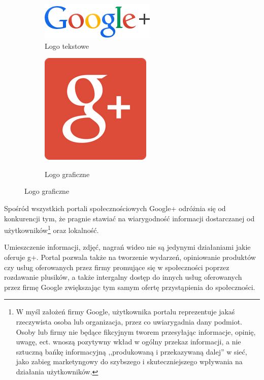 \begin{figure}[!h]
\centering
\begin{subfigure}{.5\textwidth}
  \centering
  \includegraphics[width=.4\linewidth]{images/googleplus_color.png}
  \caption{Logo tekstowe}
  \label{fig:sub1}
\end{subfigure}%
\begin{subfigure}{.5\textwidth}
  \centering
  \scalebox{0.7}
  {
      \includegraphics[width=.4\linewidth]{images/google-plus-logo.png}
  }  
  \caption{Logo graficzne}
  \label{fig:sub2}
\end{subfigure}
\label{fig:logo-google}
\end{figure}

Spośród wszystkich portali społecznościowych Google+ odróżnia się od konkurencji tym, że pragnie stawiać na wiarygodność informacji dostarczanej od użytkowników\footnote{W myśl założeń firmy Google, użytkownika portalu reprezentuje jakaś rzeczywista osoba lub organizacja, przez co uwiarygadnia dany podmiot. Osoby lub firmy nie będące fikcyjnym tworem przesyłając informacje, opinię, uwagę, ect. wnoszą pozytywny wkład w ogólny przekaz informacji, a nie sztuczną bańkę informacyjną ,,produkowaną i przekazywaną dalej'' w sieć, jako zabieg marketyngowy do szybszego i skuteczniejszego wpływania na działania użytkowników.} oraz lokalność.

Umieszczenie informacji, zdjęć, nagrań wideo nie są jedynymi działaniami jakie oferuje g+. Portal pozwala także na tworzenie wydarzeń, opiniowanie produktów czy usług oferowanych przez firmy promujące się w społeczności poprzez rozdawanie plusików, a także intergalny dostęp do innych usług oferowanych przez firmę Google zwiększając tym samym ofertę przystąpienia do społeczności.

